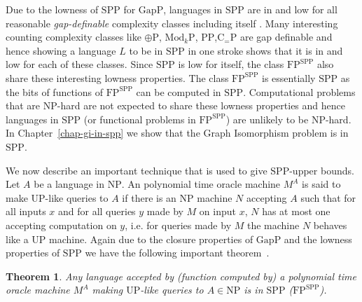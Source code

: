 \documentclass[11pt]{madras}%
\newtheorem{theorem}{Theorem}[chapter]
\theoremstyle{remark}
\newcommand{\ModkP}[1]{{\ensuremath{\mathrm{Mod}_{#1}\mathrm{P}}}}
\begin{document}
Due to the lowness of $\mathrm{SPP}$ for $\mathrm{GapP}$, languages in
$\mathrm{SPP}$ are in and low for all reasonable \emph{gap-definable}
complexity classes  including itself
\cite{fenner91gapdefinable}. Many interesting counting complexity
classes like $\oplus \mathrm{P}$, $\ModkP{k}$,
$\mathrm{PP}$,$\mathrm{C}_=\mathrm{P}$ are gap definable and hence
showing a language $L$ to be in $\mathrm{SPP}$ in one stroke shows
that it is in and low for each of these classes.  Since $\mathrm{SPP}$
is low for itself, the class $\mathrm{FP}^{\mathrm{SPP}}$ also share
these interesting lowness properties. The class
$\mathrm{FP}^{\mathrm{SPP}}$ is essentially $\mathrm{SPP}$ as the bits
of functions of $\mathrm{FP}^{\mathrm{SPP}}$ can be computed in
$\mathrm{SPP}$.  Computational problems that are $\mathrm{NP}$-hard
are not expected to share these lowness properties and hence languages
in $\mathrm{SPP}$ (or functional problems in
$\mathrm{FP}^{\mathrm{SPP}}$) are unlikely to be $\mathrm{NP}$-hard.
In Chapter~\ref{chap-gi-in-spp} we show that the Graph Isomorphism
problem is in $\mathrm{SPP}$.

We now describe an important technique that is used to give
$\mathrm{SPP}$-upper bounds. Let $A$ be a language in $\mathrm{NP}$.
An polynomial time oracle machine $M^A$ is said to make
$\mathrm{UP}$-like queries to $A$ if there is an $\mathrm{NP}$ machine
$N$ accepting $A$ such that for all inputs $x$ and for all queries $y$
made by $M$ on input $x$, $N$ has at most one accepting computation on
$y$, i.e. for queries made by $M$ the machine $N$ behaves like a
$\mathrm{UP}$ machine.  Again due to the closure properties of
$\mathrm{GapP}$ and the lowness properties of $\mathrm{SPP}$ we have
the following important theorem~\cite{kobler92graph}.

\begin{theorem}\label{thm-uplike-spp} 
  Any language accepted by (function computed by) a polynomial time
  oracle machine $M^A$ making $\mathrm{UP}$-like queries to $A \in
  \mathrm{NP}$ is in $\mathrm{SPP}$ ($\mathrm{FP}^{\mathrm{SPP}}$).
\end{theorem}
%
\end{document}
